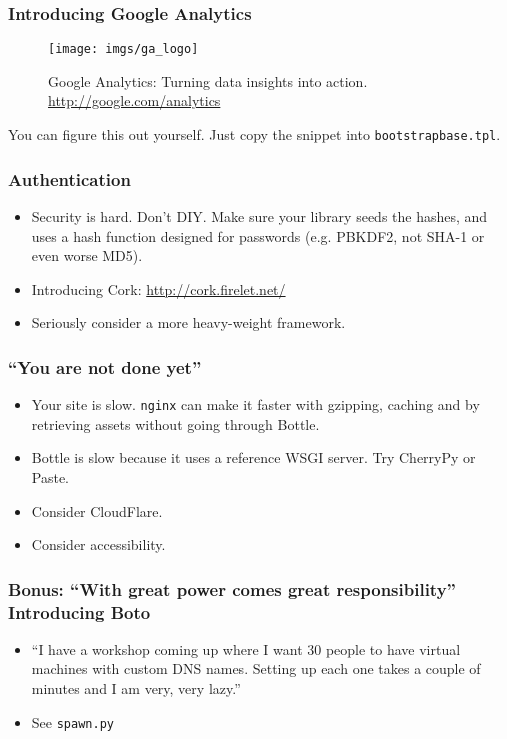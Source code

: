 \documentclass{beamer}
\begin{document}
\begin{frame}
  \frametitle{Introducing Google Analytics}
  \begin{figure}[h!]
    \centering
    \texttt{[image: imgs/ga\_logo]}
    \caption{Google Analytics: Turning data insights into action. \url{http://google.com/analytics}}
    \label{fig:ga_logo}
  \end{figure}

  You can figure this out yourself. Just copy the snippet into \texttt{bootstrapbase.tpl}.
  
\end{frame}

\begin{frame}
  \frametitle{Authentication}
  \begin{itemize}
  \item<1-> Security is hard. Don't DIY. Make sure your library
    seeds the hashes, and uses a hash function designed for passwords
    (e.g. PBKDF2, not SHA-1 or even worse MD5).
  \item<2-> Introducing Cork: \url{http://cork.firelet.net/}
  \item<3-> Seriously consider a more heavy-weight framework.
  \end{itemize}
\end{frame}

\begin{frame}
  \frametitle{``You are not done yet''}
  \begin{itemize}
  \item Your site is slow. \texttt{nginx} can make it faster with
    gzipping, caching and by retrieving assets without going through
    Bottle.
  \item Bottle is slow because it uses a reference WSGI server. Try
    CherryPy or Paste.
  \item Consider CloudFlare.
  \item Consider accessibility.
  \end{itemize}
\end{frame}

\begin{frame}
  \frametitle{Bonus: ``With great power comes great
    responsibility''\\Introducing Boto}
  
  \begin{itemize}
  \item ``I have a workshop coming up where I want 30 people to have
    virtual machines with custom DNS names. Setting up each one takes
    a couple of minutes and I am very, very lazy.''
  \item See \texttt{spawn.py}
  \end{itemize}

\end{frame}
\end{document}
